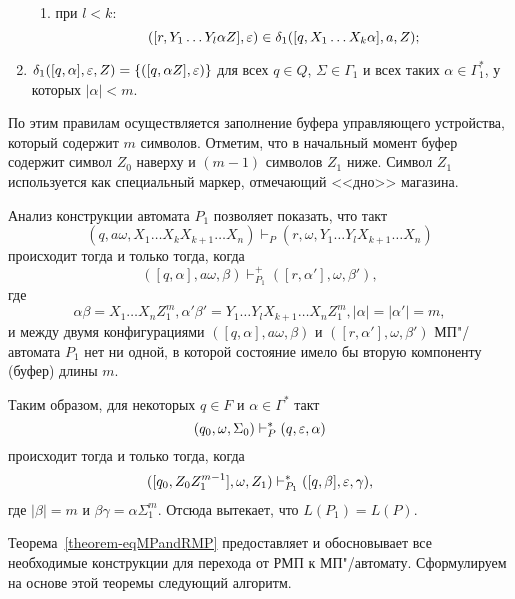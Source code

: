 \begin{myproof}
\begin{enumerate}
\begin{enumerate}
        \item при $l<k$:
        \[
        ([r,Y_1\ldots Y_l\alpha Z],\varepsilon) \in
            \delta_1([q,X_1\ldots X_k\alpha],a,Z);
        \]
    \end{enumerate}

    \item $\delta_1([q,\alpha],\varepsilon,Z)=\{([q,\alpha Z],\varepsilon)\}$ для
    всех $q\in Q$, $\Sigma\in\Gamma_1$ и всех таких
    $\alpha\in\Gamma_1^*$, у которых $|\alpha|<m$.

\end{enumerate}
По этим правилам осуществляется заполнение буфера управляющего устройства, который содержит $m$ символов. Отметим, что в начальный момент буфер содержит символ $Z_0$ наверху и $(m-1)$ символов $Z_1$ ниже. Символ $Z_1$ используется как специальный маркер, отмечающий <<дно>> магазина.

Анализ конструкции автомата $P_1$ позволяет показать, что такт
\[
    (q,a\omega,X_1\ldots X_kX_{k+1}\ldots X_n) \vdash_P
        (r,\omega,Y_1 \ldots Y_lX_{k+1} \ldots X_n)
\]
происходит тогда и только тогда, когда
\[
    ( [q,\alpha],a\omega,\beta ) \vdash_{P_1}^+
        ([r,\alpha'],\omega,\beta' ),
\]
где
\[
    \alpha\beta = X_1\ldots X_nZ_1^m, \alpha'\beta' =
        Y_1 \ldots Y_lX_{k+1} \ldots X_nZ_1^m, |\alpha| = |\alpha'| = m,
\]
и между двумя
конфигурациями $([q,\alpha],a\omega,\beta)$ и
$([r,\alpha'],\omega,\beta')$ МП"/автомата $P_1$ нет ни
одной, в которой состояние имело бы вторую компоненту (буфер) длины
$m$.

Таким образом, для некоторых $q\in F$ и $\alpha\in\Gamma^*$ такт
\[
(q_0,\omega,\Sigma_0) \vdash_P^* (q,\varepsilon,\alpha)
\]
происходит тогда и только тогда, когда
\[
([q_0,Z_0Z_1^{m-1}],\omega,Z_1) \vdash_{P_1}^*([q,\beta],\varepsilon,\gamma),
\]
где $|\beta|=m$ и $\beta\gamma=\alpha\Sigma_1^m$. Отсюда вытекает, что $L(P_1)=L(P)$.
\end{myproof}

Теорема~\ref{theorem-eqMPandRMP} предоставляет и обосновывает все необходимые конструкции для перехода от РМП к МП"/автомату. Сформулируем на основе этой теоремы следующий алгоритм.

